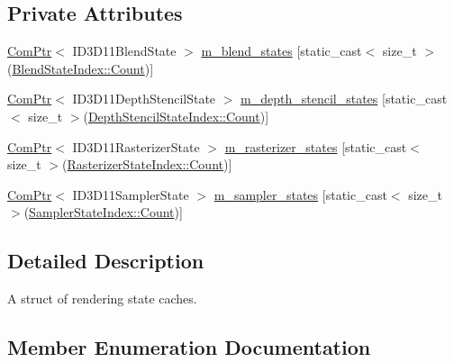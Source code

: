 \subsection*{Private Attributes}
\begin{DoxyCompactItemize}
\item 
\hyperlink{namespacemage_ae74f374780900893caa5555d1031fd79}{Com\+Ptr}$<$ I\+D3\+D11\+Blend\+State $>$ \hyperlink{structmage_1_1_rendering_state_cache_a1768aee030cb280918908996336a93af}{m\+\_\+blend\+\_\+states} \mbox{[}static\+\_\+cast$<$ size\+\_\+t $>$(\hyperlink{structmage_1_1_rendering_state_cache_af1d994cc6a3134ded0b24353de5686d0ae93f994f01c537c4e2f7d8528c3eb5e9}{Blend\+State\+Index\+::\+Count})\mbox{]}
\item 
\hyperlink{namespacemage_ae74f374780900893caa5555d1031fd79}{Com\+Ptr}$<$ I\+D3\+D11\+Depth\+Stencil\+State $>$ \hyperlink{structmage_1_1_rendering_state_cache_a749b6533a318438e309b7ae462e8537f}{m\+\_\+depth\+\_\+stencil\+\_\+states} \mbox{[}static\+\_\+cast$<$ size\+\_\+t $>$(\hyperlink{structmage_1_1_rendering_state_cache_af6e27c63442c684390b23b6a85020f15ae93f994f01c537c4e2f7d8528c3eb5e9}{Depth\+Stencil\+State\+Index\+::\+Count})\mbox{]}
\item 
\hyperlink{namespacemage_ae74f374780900893caa5555d1031fd79}{Com\+Ptr}$<$ I\+D3\+D11\+Rasterizer\+State $>$ \hyperlink{structmage_1_1_rendering_state_cache_a858648eef1ec717f0f2b2f98a8703964}{m\+\_\+rasterizer\+\_\+states} \mbox{[}static\+\_\+cast$<$ size\+\_\+t $>$(\hyperlink{structmage_1_1_rendering_state_cache_ab3cd83fde15cb9f0858e9617e32cd044ae93f994f01c537c4e2f7d8528c3eb5e9}{Rasterizer\+State\+Index\+::\+Count})\mbox{]}
\item 
\hyperlink{namespacemage_ae74f374780900893caa5555d1031fd79}{Com\+Ptr}$<$ I\+D3\+D11\+Sampler\+State $>$ \hyperlink{structmage_1_1_rendering_state_cache_a7118f82f0ed5ac110588811558695390}{m\+\_\+sampler\+\_\+states} \mbox{[}static\+\_\+cast$<$ size\+\_\+t $>$(\hyperlink{structmage_1_1_rendering_state_cache_a4e1d4796699929e0618ff54621910770ae93f994f01c537c4e2f7d8528c3eb5e9}{Sampler\+State\+Index\+::\+Count})\mbox{]}
\end{DoxyCompactItemize}


\subsection{Detailed Description}
A struct of rendering state caches. 

\subsection{Member Enumeration Documentation}
\hypertarget{structmage_1_1_rendering_state_cache_af1d994cc6a3134ded0b24353de5686d0}{}\label{structmage_1_1_rendering_state_cache_af1d994cc6a3134ded0b24353de5686d0} 
